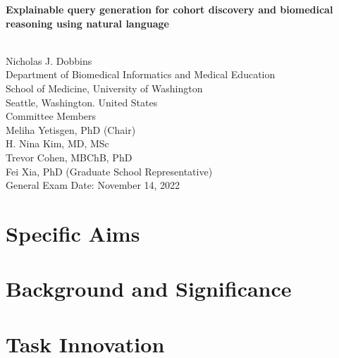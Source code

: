 \documentclass[12pt]{article} %
\begin{document}
\begin{titlepage}
    \begin{center}
        \vspace*{1cm}
        \begin{huge}
            \textbf{Explainable query generation for cohort discovery and biomedical reasoning using natural language}
        \end{huge} \\
        \vspace{0.7cm}
        Nicholas J. Dobbins \\
        Department of Biomedical Informatics and Medical Education \\
        School of Medicine, University of Washington \\
        Seattle, Washington. United States \\
        \vspace{0.7cm}
        Committee Members \\
        Meliha Yetisgen, PhD (Chair) \\
        H. Nina Kim, MD, MSc \\
        Trevor Cohen, MBChB, PhD \\
        Fei Xia, PhD (Graduate School Representative) \\
        \vspace{0.7cm}
        General Exam Date: November 14, 2022
    \end{center}
\end{titlepage}

\tableofcontents
\thispagestyle{empty}
\newpage
\addtocounter{page}{-1}
 
\section{Specific Aims}
\label{sec:specific_aims}

\newpage

\section{Background and Significance}
\label{sec:background}


\section{Task Innovation}
\label{sec:task_innovation}

\end{document}
